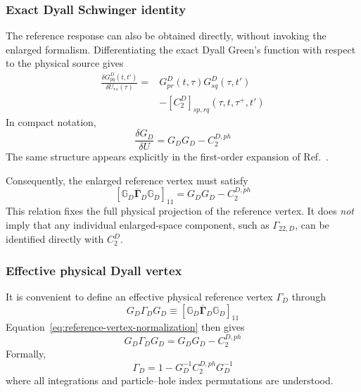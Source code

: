 \documentclass[aip,jcp,reprint,noshowkeys,superscriptaddress]{revtex4-1}
\begin{document}
\subsubsection{Exact Dyall Schwinger identity}

The reference response can also be obtained directly, without invoking
the enlarged formalism.  Differentiating the exact Dyall Green's
function with respect to the physical source gives
\begin{equation}
  \begin{aligned}
  \frac{
    \delta G^D_{pq}(t,t')
  }{
    \delta U_{rs}(\tau)
  }
  ={}&
  G^D_{pr}(t,\tau)
  G^D_{sq}(\tau,t')
  \\
  &-
  [C_2^D]_{sp,rq}
  (\tau,t,\tau^+,t')
  \end{aligned}
  \label{eq:dyall-schwinger}
\end{equation}
In compact notation,
\begin{equation}
  \frac{\delta G_D}{\delta U}
  =
  G_DG_D
  -
  C_2^{D,ph}
  \label{eq:dyall-schwinger-compact}
\end{equation}
The same structure appears explicitly in the first-order expansion of
Ref.~\cite{WangFangLi2026}.

Consequently, the enlarged reference vertex must satisfy
\begin{equation}
  \left[
    \mathbb G_D
    \overline{\boldsymbol\Gamma}_D
    \mathbb G_D
  \right]_{11}
  =
  G_DG_D
  -
  C_2^{D,ph}
  \label{eq:reference-vertex-normalization}
\end{equation}
This relation fixes the full physical projection of the reference
vertex.  It does \emph{not} imply that any individual enlarged-space
component, such as $\Gamma_{22,D}$, can be identified directly with
$C_2^D$.


\subsubsection{Effective physical Dyall vertex}

It is convenient to define an effective physical reference vertex
$\Gamma_D$ through
\begin{equation}
  G_D
  \Gamma_D
  G_D
  \equiv
  \left[
    \mathbb G_D
    \overline{\boldsymbol\Gamma}_D
    \mathbb G_D
  \right]_{11}
\end{equation}
Equation~\eqref{eq:reference-vertex-normalization} then gives
\begin{equation}
  G_D
  \Gamma_D
  G_D
  =
  G_DG_D
  -
  C_2^{D,ph}
  \label{eq:physical-dyall-vertex}
\end{equation}
Formally,
\begin{equation}
  \Gamma_D
  =
  1
  -
  G_D^{-1}
  C_2^{D,ph}
  G_D^{-1}
  \label{eq:dyall-vertex}
\end{equation}
where all integrations and particle--hole index permutations are
understood.
\end{document}
